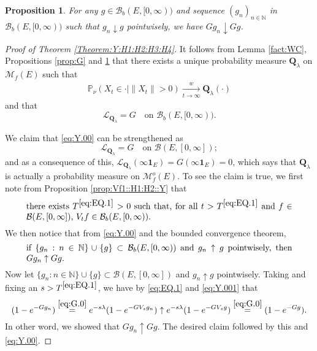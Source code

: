 \documentclass[12pt,a4paper]{amsart}
\numberwithin{equation}{section}
\theoremstyle{plain}
\newtheorem{prop}[thm]{Proposition}
\theoremstyle{definition}
\theoremstyle{remark}
\begin{document}
\begin{prop} \label{prop::GD:H1:H2:H3:H4::Y}
	For any $g\in \mathcal B_b(E,[0,\infty))$ and 
	sequence $(g_n)_{n\in \mathbb N}$ in $\mathcal B_b(E,[0,\infty))$
	such that $g_n \downarrow g$ pointwisely,
	we have $G g_n \downarrow Gg$.
\end{prop}

\begin{proof}[Proof of Theorem \ref{Theorem:Y:H1:H2:H3:H4}]
	It follows from Lemma \ref{fact:WC}, Propositions \ref{prop:G} and \ref{prop::GD:H1:H2:H3:H4::Y} that there exists a unique probability measure $\mathbf Q_\lambda$ on $\mathcal M_f(E)$ such that
\begin{align}\label{eq:Y.0}
 	\mathbb P_{\nu}(X_t \in \cdot | \|X_t\|>0 )
\xrightarrow[t\to \infty]{w} \mathbf Q_\lambda(\cdot)
\end{align}
	and that
\begin{equation} \label{eq:Y.00}
	\mathscr L_{\mathbf Q_\lambda} = G \quad \mbox{on } \mathcal B_b(E,[0,\infty)).
\end{equation}


	We claim that \eqref{eq:Y.00} can be strengthened as
\begin{equation} \label{eq:Y.000}
	\mathscr L_{\mathbf Q_\lambda}
	= G \quad \mbox{on } \mathcal B(E,[0,\infty]);
\end{equation}
	and as a consequence of this, 
$\mathscr L_{\mathbf Q_\lambda}(\infty \mathbf 1_E) = G(\infty \mathbf 1_E)= 0$, which says that $\mathbf Q_\lambda$ is actually a probability measure on $\mathcal M_f^o(E)$.
	To see the claim is true, we first note from Proposition \ref{prop:Vf1::H1:H2::Y} that
\begin{equation} \label{eq:EQ.1} \begin{minipage}{0.9\textwidth}
	there exists $T^{\eqref{eq:EQ.1}}>0$ such that, for all $t>T^{\eqref{eq:EQ.1}}$ and $f\in \mathcal B(E,[0,\infty])$, $V_tf \in \mathcal B_b(E,[0,\infty))$.
\end{minipage} \end{equation}
	 We then notice that from \eqref{eq:Y.00} and the bounded convergence theorem,
\begin{equation} \label{eq:Y.001}
\begin{minipage}{0.9\textwidth}
	if $\{g_n:n\in \mathbb N\} \cup \{g\} \subset \mathcal B_b(E,[0,\infty))$ and $g_n \uparrow g$ pointwisely, then $Gg_n \uparrow Gg$.
\end{minipage}
\end{equation}
	Now let $\{g_n:n\in \mathbb N\} \cup \{g\} \subset \mathcal B(E,[0,\infty])$ and $g_n \uparrow g$ pointwisely.
	Taking and fixing an $s > T^{\eqref{eq:EQ.1}}$, we have by \eqref{eq:EQ.1} and \eqref{eq:Y.001} that
\[
	(1 - e^{-G g_n})
	\overset{\eqref{eq:G.0}} = e^{- s\lambda } (1 - e^{- G V_s g_n})
	\uparrow e^{- s\lambda } (1 - e^{- G V_s g})
	\overset{\eqref{eq:G.0}} =(1 - e^{-G g}).
\]
	In other word, we showed that $Gg_n \uparrow Gg$.
	The desired claim followed by this and \eqref{eq:Y.00}.



\end{proof}
\end{document}
